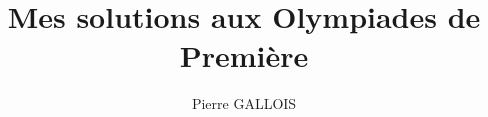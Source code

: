 \documentclass[a4paper,12pt, titlepage]{book}
\begin{document}
	
\renewcommand{\chaptername}{Exercice}

\author{Pierre GALLOIS}
\title{Mes solutions aux Olympiades de Première}

\maketitle

\setcounter{tocdepth}{0}
\tableofcontents



\end{document}
